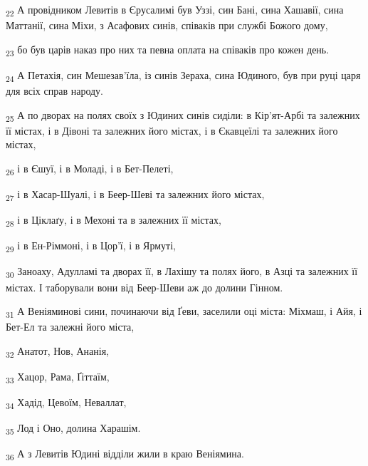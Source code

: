 \begin{tcolorbox}
\textsubscript{22} А провідником Левитів в Єрусалимі був Уззі, син Бані, сина Хашавії, сина Маттанії, сина Міхи, з Асафових синів, співаків при службі Божого дому,
\end{tcolorbox}
\begin{tcolorbox}
\textsubscript{23} бо був царів наказ про них та певна оплата на співаків про кожен день.
\end{tcolorbox}
\begin{tcolorbox}
\textsubscript{24} А Петахія, син Мешезав'їла, із синів Зераха, сина Юдиного, був при руці царя для всіх справ народу.
\end{tcolorbox}
\begin{tcolorbox}
\textsubscript{25} А по дворах на полях своїх з Юдиних синів сиділи: в Кір'ят-Арбі та залежних її містах, і в Дівоні та залежних його містах, і в Єкавцеїлі та залежних його містах,
\end{tcolorbox}
\begin{tcolorbox}
\textsubscript{26} і в Єшуї, і в Моладі, і в Бет-Пелеті,
\end{tcolorbox}
\begin{tcolorbox}
\textsubscript{27} і в Хасар-Шуалі, і в Беер-Шеві та залежних його містах,
\end{tcolorbox}
\begin{tcolorbox}
\textsubscript{28} і в Ціклаґу, і в Мехоні та в залежних її містах,
\end{tcolorbox}
\begin{tcolorbox}
\textsubscript{29} і в Ен-Ріммоні, і в Цор'ї, і в Ярмуті,
\end{tcolorbox}
\begin{tcolorbox}
\textsubscript{30} Заноаху, Адулламі та дворах її, в Лахішу та полях його, в Азці та залежних її містах. І таборували вони від Беер-Шеви аж до долини Гінном.
\end{tcolorbox}
\begin{tcolorbox}
\textsubscript{31} А Веніяминові сини, починаючи від Ґеви, заселили оці міста: Міхмаш, і Айя, і Бет-Ел та залежні його міста,
\end{tcolorbox}
\begin{tcolorbox}
\textsubscript{32} Анатот, Нов, Ананія,
\end{tcolorbox}
\begin{tcolorbox}
\textsubscript{33} Хацор, Рама, Ґіттаїм,
\end{tcolorbox}
\begin{tcolorbox}
\textsubscript{34} Хадід, Цевоїм, Неваллат,
\end{tcolorbox}
\begin{tcolorbox}
\textsubscript{35} Лод і Оно, долина Харашім.
\end{tcolorbox}
\begin{tcolorbox}
\textsubscript{36} А з Левитів Юдині відділи жили в краю Веніямина.
\end{tcolorbox}
